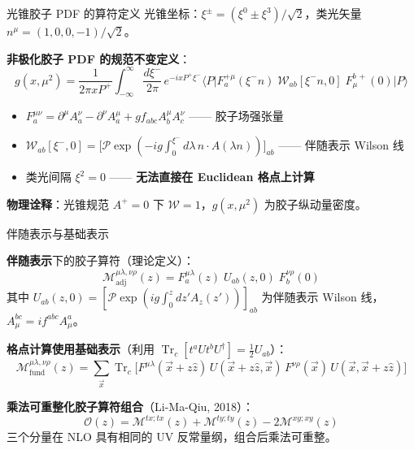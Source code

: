 \documentclass[10pt,aspectratio=169]{beamer}
\newcommand{\trc}{\operatorname{Tr}_c}
\begin{document}
\begin{frame}{光锥胶子 PDF 的算符定义}
\small
光锥坐标：$\xi^\pm = (\xi^0 \pm \xi^3)/\sqrt{2}$，类光矢量 $n^\mu = (1,0,0,-1)/\sqrt{2}$。

\textbf{非极化胶子 PDF 的规范不变定义}：
\begin{equation}
  \boxed{
  g(x, \mu^2) = \frac{1}{2\pi x P^+}
  \int_{-\infty}^{\infty} \frac{d\xi^{-}}{2\pi}\,
  e^{-i x P^+ \xi^{-}}
  \big\langle P \big|
  F_a^{+\mu}(\xi^{-} n)\;
  \mathcal{W}_{ab}[\xi^{-} n, 0]\;
  F_{\mu}^{b\,+}(0)
  \big| P \big\rangle
  }
\end{equation}

\begin{itemize}
  \item $F_a^{\mu\nu} = \partial^\mu A_a^\nu - \partial^\nu A_a^\mu + g f_{abc} A_b^\mu A_c^\nu$ —— 胶子场强张量
  \item $\mathcal{W}_{ab}[\xi^-, 0] = \big[\mathcal{P}\exp(-ig \int_0^{\xi^-} d\lambda\, n\!\cdot\!A(\lambda n))\big]_{ab}$ —— 伴随表示 Wilson 线
  \item 类光间隔 $\xi^2 = 0$ —— \textbf{无法直接在 Euclidean 格点上计算}
\end{itemize}

\textbf{物理诠释}：光锥规范 $A^+=0$ 下 $\mathcal{W}=1$，$g(x,\mu^2)$ 为胶子纵动量密度。
\end{frame}

\begin{frame}{伴随表示与基础表示}
{\small
\textbf{伴随表示}下的胶子算符（理论定义）：
\begin{equation*}
  \mathcal{M}^{\mu\lambda,\nu\rho}_{\text{adj}}(z) = F^{\mu\lambda}_a(z)\;U_{ab}(z,0)\;F^{\nu\rho}_b(0)
\end{equation*}
其中 $U_{ab}(z,0) = [\mathcal{P}\exp(ig\int_0^z dz' A_z(z'))]_{ab}$ 为伴随表示 Wilson 线，
$A^{bc}_\mu = i f^{abc} A^a_\mu$。

\textbf{格点计算使用基础表示}（利用 $\trc[t^a U t^b U^\dagger] = \frac{1}{2}U_{ab}$）：
\begin{equation}
  \boxed{
  \mathcal{M}^{\mu\lambda,\nu\rho}_{\text{fund}}(z) = \sum_{\vec{x}}
  \trc\!\Big[F^{\mu\lambda}(\vec{x}+z\hat{z})\,
  U(\vec{x}+z\hat{z}, \vec{x})\,
  F^{\nu\rho}(\vec{x})\,
  U(\vec{x}, \vec{x}+z\hat{z})\Big]
  }
\end{equation}

\textbf{乘法可重整化胶子算符组合}（Li-Ma-Qiu, 2018）：
\begin{equation}
  \boxed{
  \mathcal{O}(z) = \mathcal{M}^{tx;tx}(z) + \mathcal{M}^{ty;ty}(z) - 2\mathcal{M}^{xy;xy}(z)
  }
\end{equation}
三个分量在 NLO 具有相同的 UV 反常量纲，组合后乘法可重整。
}
\end{frame}
\end{document}
